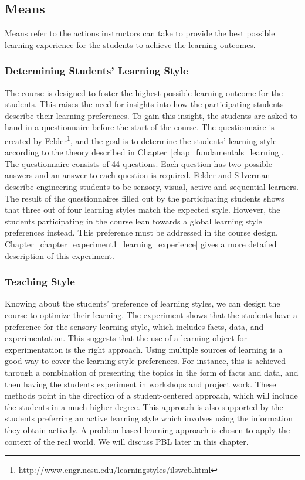 \subsection*{Means}
Means refer to the actions instructors can take to provide the best possible learning experience for the students to achieve the learning outcomes. 

\subsubsection*{Determining Students' Learning Style}
The course is designed to foster the highest possible learning outcome for the students. This raises the need for insights into how the participating students describe their learning preferences. To gain this insight, the students are asked to hand in a questionnaire before the start of the course. The questionnaire is created by Felder\footnote{\url{http://www.engr.ncsu.edu/learningstyles/ilsweb.html}}, and the goal is to determine the students' learning style according to the theory described in Chapter~\ref{chap_fundamentals_learning}. The questionnaire consists of 44 questions. Each question has two possible answers and an answer to each question is required. Felder and Silverman describe engineering students to be sensory, visual, active and sequential learners. The result of the questionnaires filled out by the participating students shows that three out of four learning styles match the expected style. However, the students participating in the course lean towards a global learning style preferences instead. This preference must be addressed in the course design. Chapter~\ref{chapter_experiment1_learning_experience} gives a more detailed description of this experiment.


\subsubsection*{Teaching Style}
Knowing about the students' preference of learning styles, we can design the course to optimize their learning. The experiment shows that the students have a preference for the sensory learning style, which includes facts, data, and experimentation. This suggests that the use of a learning object for experimentation is the right approach. Using multiple sources of learning is a good way to cover the learning style preferences. For instance, this is achieved through a combination of presenting the topics in the form of facts and data, and then having the students experiment in workshops and project work. These methods point in the direction of a student-centered approach, which will include the students in a much higher degree. This approach is also supported by the students preferring an active learning style which involves using the information they obtain actively. A problem-based learning approach is chosen to apply the context of the real world. We will discuss PBL later in this chapter. \\


